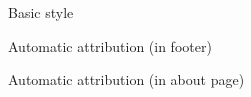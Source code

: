 \documentclass[10pt]{beamer}
\begin{document}
\begin{frame}[fragile]{Basic style}
\vfill{}\vfill
\end{frame}

\begin{frame}[fragile]{Automatic attribution (in footer)}
\vfill{}\vfill
\end{frame}

\begin{frame}[fragile]{Automatic attribution (in about page)}
\vfill{}\vfill
\end{frame}
\end{document}

